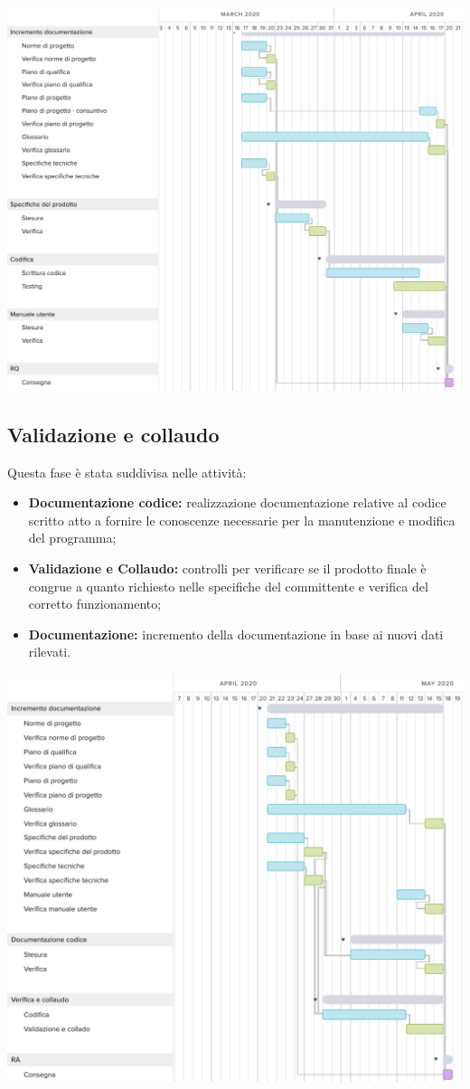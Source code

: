 \includegraphics[width=\textwidth]{res/img/g4}

\subsection{Validazione e collaudo}
Questa fase è stata suddivisa nelle attività:
\begin{itemize}
	\item \textbf{Documentazione codice:} realizzazione documentazione relative al codice scritto atto a fornire le conoscenze necessarie per la manutenzione e modifica del programma;
	\item \textbf{Validazione e Collaudo:} controlli per verificare se il prodotto finale è congrue a quanto richiesto nelle specifiche del committente e verifica del corretto funzionamento;
	\item \textbf{Documentazione:} incremento della documentazione in base ai nuovi dati rilevati.
\end{itemize}
\includegraphics[width=\textwidth]{res/img/g5}